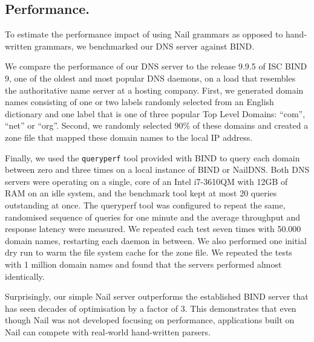 \subsection{Performance.}

To estimate the performance impact of using Nail grammars as opposed to hand-written grammars, we
benchmarked our DNS server against BIND.

We compare the performance of our DNS server to the release 9.9.5 of ISC BIND 9\cite{bind8}, one of
the oldest and most popular DNS daemons, on a load that resembles the authoritative name server at a
hosting company. First, we generated domain names consisting of one or
two labels randomly selected from an English dictionary and one label that is one of three popular
Top Level Domains: ``com'', ``net'' or ``org''. Second, we randomly selected 90\% of these domains and
created a zone file that mapped these domain names to the local IP address. 

Finally, we used the \texttt{queryperf} tool provided with BIND to query each domain between zero
and three times on a local instance of BIND or NailDNS. Both DNS servers were operating on a single, 
core  of an Intel i7-3610QM with 12GB of RAM on an idle system, and the benchmark tool kept at most 20
queries outstanding at once. The queryperf tool was configured to
repeat the same, randomised sequence of queries for one minute and the average throughput and
response latency were measured.  We repeated each test seven times  with 50.000
domain names, restarting each daemon in between. We also performed one initial dry run to warm the
file system cache for the zone file. We repeated the tests with 1 million domain names and found
that the servers performed almost identically.

Surprisingly, our simple Nail server outperforms the established BIND server that has seen decades
of optimisation by a factor of 3.  This demonstrates that even though Nail was
not developed focusing on performance, applications built on Nail can compete with real-world
hand-written parsers.



